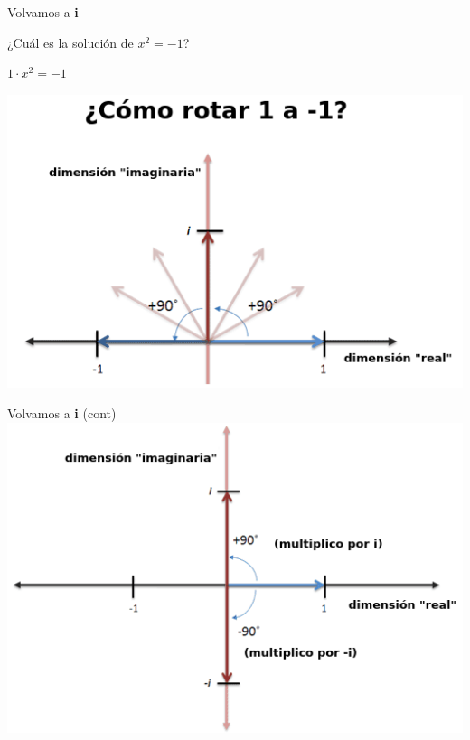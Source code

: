 \documentclass[10pt]{beamer}
\begin{document}
\begin{frame}{Volvamos a \textbf{i}}

¿Cuál es la solución de $x^2=-1$? 


$1\cdot x^2 = -1$




\includegraphics[scale=0.78]{rotate1m1.png}


\end{frame}


\begin{frame}{Volvamos a \textbf{i} (cont)}
	\includegraphics[scale=0.78]{rotate1m1_2.png}
	
\end{frame}
\end{document}

